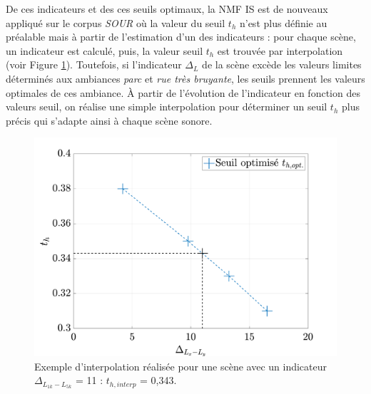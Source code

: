 De ces indicateurs et des ces seuils optimaux, la NMF IS est de nouveaux appliqué sur le corpus \textit{SOUR} où la valeur du seuil $t_h$ n'est plus définie au préalable mais à partir de l'estimation d'un des indicateurs : pour chaque scène, un indicateur est calculé, puis, la valeur seuil $t_h$ est trouvée par interpolation (voir Figure \ref{fig:interpolation}). Toutefois, si l'indicateur $\Delta_L$ de la scène excède les valeurs limites déterminés aux ambiances \textit{parc} et \textit{rue très bruyante}, les seuils prennent les valeurs optimales de ces ambiance.  À partir de l'évolution de l'indicateur en fonction des valeurs seuil, on réalise une simple interpolation pour déterminer un seuil $t_h$ plus précis qui s'adapte ainsi à chaque scène sonore.


\begin{figure}[h]
\centering
\includegraphics[width=.7\linewidth]{./figures/resultats/interpolationOpt.pdf}
\caption{Exemple d'interpolation réalisée pour une scène avec un indicateur $\Delta_{L_{1k}-L_{5k}}$ = 11 : $t_{h,interp}$ = 0,343.}
\label{fig:interpolation}
\end{figure}

